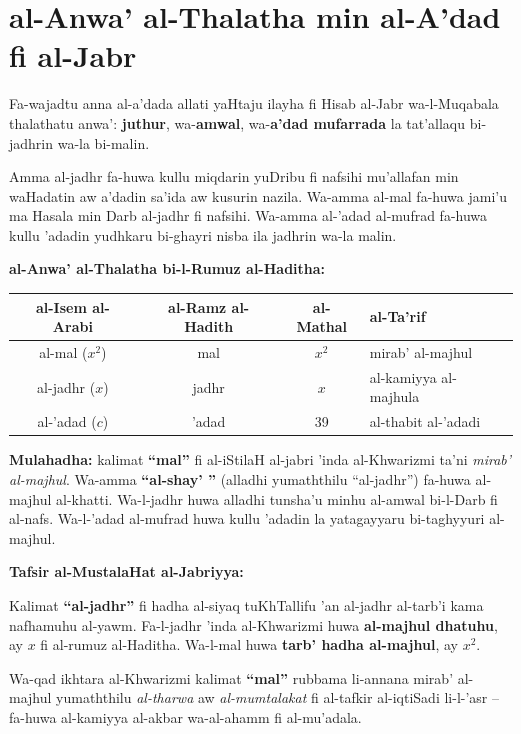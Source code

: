 \documentclass[11pt,a4paper]{book}
\begin{document}
\section{al-Anwa' al-Thalatha min al-A'dad fi al-Jabr}

\begin{originaltext}
Fa-wajadtu anna al-a'dada allati yaHtaju ilayha fi Hisab al-Jabr
wa-l-Muqabala thalathatu anwa': \textbf{juthur}, wa-\textbf{amwal},
wa-\textbf{a'dad mufarrada} la tat'allaqu bi-jadhrin wa-la bi-malin.

Amma al-jadhr fa-huwa kullu miqdarin yuDribu fi nafsihi mu'allafan
min waHadatin aw a'dadin sa'ida aw kusurin nazila. Wa-amma al-mal
fa-huwa jami'u ma Hasala min Darb al-jadhr fi nafsihi. Wa-amma
al-'adad al-mufrad fa-huwa kullu 'adadin yudhkaru bi-ghayri nisba ila
jadhrin wa-la malin.
\end{originaltext}

\begin{mathexplain}
\textbf{al-Anwa' al-Thalatha bi-l-Rumuz al-Haditha:}

\begin{center}
\begin{tabular}{|c|c|c|l|}
\hline
\textbf{al-Isem al-Arabi} & \textbf{al-Ramz al-Hadith} & \textbf{al-Mathal} & \textbf{al-Ta'rif} \\
\hline
al-mal ($x^2$) & mal & $x^2$ & mirab' al-majhul \\
\hline
al-jadhr ($x$) & jadhr & $x$ & al-kamiyya al-majhula \\
\hline
al-'adad ($c$) & 'adad & 39 & al-thabit al-'adadi \\
\hline
\end{tabular}
\end{center}

\vspace{0.3cm}

\textbf{Mulahadha:} kalimat \textbf{``mal''} fi al-iStilaH al-jabri
'inda al-Khwarizmi ta'ni \textit{mirab' al-majhul}. Wa-amma
\textbf{``al-shay' ''} (alladhi yumaththilu ``al-jadhr'')
fa-huwa al-majhul al-khatti. Wa-l-jadhr huwa alladhi tunsha'u
minhu al-amwal bi-l-Darb fi al-nafs. Wa-l-'adad al-mufrad huwa
kullu 'adadin la yatagayyaru bi-taghyyuri al-majhul.
\end{mathexplain}

\begin{commentary}
\textbf{Tafsir al-MustalaHat al-Jabriyya:}

Kalimat \textbf{``al-jadhr''} fi hadha al-siyaq tuKhTallifu 'an
al-jadhr al-tarb'i kama nafhamuhu al-yawm. Fa-l-jadhr 'inda
al-Khwarizmi huwa \textbf{al-majhul dhatuhu}, ay $x$ fi al-rumuz
al-Haditha. Wa-l-mal huwa \textbf{tarb' hadha al-majhul}, ay $x^2$.

Wa-qad ikhtara al-Khwarizmi kalimat \textbf{``mal''} rubbama
li-annana mirab' al-majhul yumaththilu \textit{al-tharwa} aw
\textit{al-mumtalakat} fi al-tafkir al-iqtiSadi li-l-'asr -- fa-huwa
al-kamiyya al-akbar wa-al-ahamm fi al-mu'adala.
\end{commentary}
\end{document}
